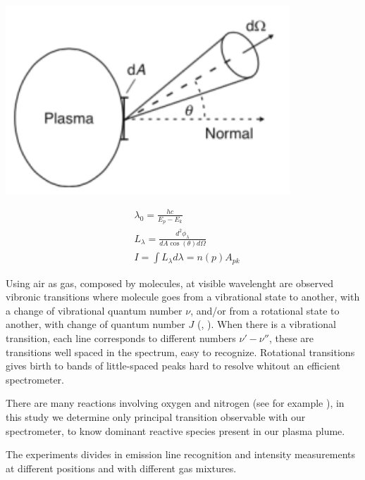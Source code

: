 \begin{minipage}{.48\textwidth}
 \includegraphics[width=0.8\textwidth]{Images/Spectroscopy/plasmaemission.png}
\end{minipage}
\begin{minipage}{.48\textwidth}
\begin{equation}
 \begin{split}
 &\lambda_{0} = \frac{hc}{E_p - E_k} \\
 &L_{\lambda} = \frac{d^2\phi_{\lambda}}{dA \cos(\theta) d\Omega} \\
 &I = \int L_{\lambda} d\lambda = n(p) A_{pk}
 \end{split} 
 \label{eq:emission}
\end{equation}
\end{minipage}


Using air as gas, composed by molecules, at visible wavelenght are observed vibronic transitions where molecule goes from a vibrational state to another, with a change of vibrational quantum number $\nu$, and/or from a rotational state to another, with change of quantum number $J$ (\cite{book:137793}, \cite{wiki:vibronic}). When there is a vibrational transition, each line corresponds to different numbers $\nu'-\nu''$, these are transitions well spaced in the spectrum, easy to recognize. Rotational transitions gives birth to bands of little-spaced peaks hard to resolve whitout an efficient spectrometer.

There are many reactions involving oxygen and nitrogen (see for example \cite{Kossyi_1992}), in this study we determine only principal transition observable with our spectrometer, to know dominant reactive species present in our plasma plume.

The experiments divides in emission line recognition and intensity measurements at different positions and with different gas mixtures.

